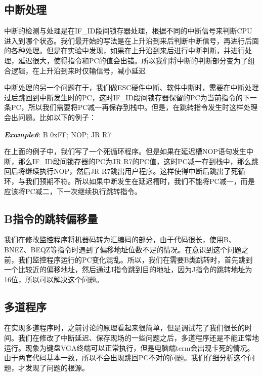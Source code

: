 
\subsection{中断处理}

中断的检测与处理是在IF\_ID段间锁存器处理，根据不同的中断信号来判断CPU进入到哪个状态。我们最开始的写法是在上升沿到来后判断中断信号，再进行后面的各种处理。但是在实验中发现，如果在上升沿到来后进行中断判断，并进行处理，延迟很大，使得指令和PC的值会出错。所以我们将中断的判断部分变为了组合逻辑，在上升沿到来时仅输信号，减小延迟

中断处理的另一个问题在于，我们做ESC硬件中断、软件中断时，需要在中断处理过后跳回到中断发生时的PC，这时IF\_ID段间锁存器保留的PC为当前指令的下一条PC，所以我们需要将PC减一再保存到栈中。但是，在跳转指令发生时这样处理会出问题。比如以下的例子：

\textbf{\textit{Example6}}: \quad B 0xFF; \quad NOP; \quad JR R7

在上面的例子中，我们写了一个死循环程序。但是如果在延迟槽NOP语句发生中断，那么IF\_ID段间锁存器的PC为JR R7的PC值，这时PC减一存到栈中，那么跳回后将继续执行NOP，然后JR R7跳出用户程序。这样使得中断后跳出了死循环，与我们预期不符。所以如果中断发生在延迟槽时，我们不能将PC减一，而是应该将PC减二，下一次继续执行跳转指令。

\subsection{B指令的跳转偏移量}

我们在修改监控程序将机器码转为汇编码的部分，由于代码很长，使用B、BNEZ、BEQZ等指令时遇到了偏移地址位数不足的情况。在意识到这个问题之前，我们监控程序运行的PC变化混乱。所以，我们在需要B类跳转时，首先跳到一个比较近的偏移地址，然后通过J指令跳到目的地址，因为J指令的跳转地址为16位，所以可以解决这个问题。

\subsection{多道程序}

在实现多道程序时，之前讨论的原理看起来很简单，但是调试花了我们很长的时间。我们在修改了中断延迟、保存现场的一些问题之后，多道程序还是不能正常地运行。现象为键盘VGA终端可以正常执行，但是电脑端term会出现卡死的情况。由于两套代码基本一致，所以不会出现跳回PC不对的问题。我们仔细分析这个问题，才发现了问题的根源。

